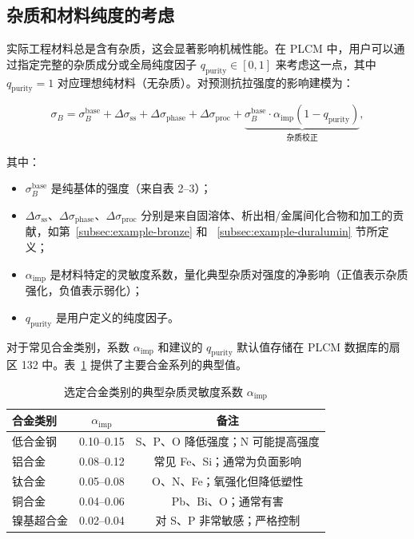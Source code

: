 \documentclass[12pt,a4paper]{article}
\begin{document}
	\subsection{杂质和材料纯度的考虑}
	\label{subsec:purity}
	
	实际工程材料总是含有杂质，这会显著影响机械性能。在 PLCM 中，用户可以通过指定完整的杂质成分或全局纯度因子 \(q_{\mathrm{purity}} \in [0,1]\) 来考虑这一点，其中 \(q_{\mathrm{purity}}=1\) 对应理想纯材料（无杂质）。对预测抗拉强度的影响建模为：
	
	\[
	\sigma_B = \sigma_B^{\mathrm{base}} + \Delta\sigma_{\mathrm{ss}} + \Delta\sigma_{\mathrm{phase}} + \Delta\sigma_{\mathrm{proc}} + \underbrace{\sigma_B^{\mathrm{base}} \cdot \alpha_{\mathrm{imp}} (1 - q_{\mathrm{purity}})}_{\text{杂质校正}},
	\]
	
	其中：
	\begin{itemize}
		\item \(\sigma_B^{\mathrm{base}}\) 是纯基体的强度（来自表 2–3）；
		\item \(\Delta\sigma_{\mathrm{ss}}\)、\(\Delta\sigma_{\mathrm{phase}}\)、\(\Delta\sigma_{\mathrm{proc}}\) 分别是来自固溶体、析出相/金属间化合物和加工的贡献，如第~\ref{subsec:example-bronze} 和 ~\ref{subsec:example-duralumin} 节所定义；
		\item \(\alpha_{\mathrm{imp}}\) 是材料特定的灵敏度系数，量化典型杂质对强度的净影响（正值表示杂质强化，负值表示弱化）；
		\item \(q_{\mathrm{purity}}\) 是用户定义的纯度因子。
	\end{itemize}
	
	对于常见合金类别，系数 \(\alpha_{\mathrm{imp}}\) 和建议的 \(q_{\mathrm{purity}}\) 默认值存储在 PLCM 数据库的扇区 132 中。表~\ref{tab:impurity-coefficients} 提供了主要合金系列的典型值。
	
	\begin{table}[htbp]
		\centering
		\caption{选定合金类别的典型杂质灵敏度系数 \(\alpha_{\mathrm{imp}}\)}
		\label{tab:impurity-coefficients}
		\begin{tabular}{lcc}
			\toprule
			\textbf{合金类别} & \(\alpha_{\mathrm{imp}}\) & \textbf{备注} \\
			\midrule
			低合金钢 & 0.10–0.15 & S、P、O 降低强度；N 可能提高强度 \\
			铝合金 & 0.08–0.12 & 常见 Fe、Si；通常为负面影响 \\
			钛合金 & 0.05–0.08 & O、N、Fe；氧强化但降低塑性 \\
			铜合金 & 0.04–0.06 & Pb、Bi、O；通常有害 \\
			镍基超合金 & 0.02–0.04 & 对 S、P 非常敏感；严格控制 \\
			\bottomrule
		\end{tabular}
	\end{table}
	
\end{document}
